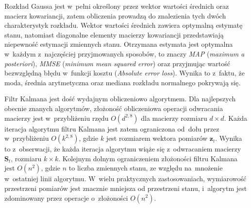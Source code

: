 \par
Rozkład Gaussa jest w~pełni określony przez wektor wartości średnich oraz macierz kowariancji, zatem obliczenia prowadzą do znalezienia tych dwóch charakterystyk rozkładu. Wektor wartości średnich zawiera optymalną estymatę stanu, natomiast diagonalne elementy macierzy kowariancji przedstawiają niepewność estymacji zmiennych stanu. Otrzymana estymata jest optymalna w~każdym z~najczęściej przyjmowanych sposobów, to znaczy \textit{MAP} (\textit{maximum a posteriori}), \textit{MMSE} (\textit{minimum mean squared error}) oraz przyjmując wartość bezwzględną błędu w~funkcji kosztu (\textit{Absolute error loss}). Wynika to z~faktu, że moda, średnia arytmetyczna oraz mediana rozkładu normalnego pokrywają się. \cite[21]{Sarka} %
\par
Filtr Kalmana jest dość wydajnym obliczeniowo algorytmem. Dla najlepszych obecnie znanych algorytmów, złożoność obliczeniowa operacji odwracania macierzy jest w~przybliżeniu rzędu $O(d^{2,8})$ dla macierzy rozmiaru $d \times d$. Każda iteracja algorytmu filtru Kalmana jest zatem ograniczona od~dołu przez w~przybliżeniu $O(k^{2,8})$, gdzie $k$ jest rozmiarem wektora pomiarów $\mathbf{z}_t$. Wynika to z~obserwacji, że każda iteracja algorytmu wiąże się z~odwracaniem macierzy $\mathbf{S}_t$, rozmiaru $k \times k$. Kolejnym dolnym ograniczeniem złożoności filtru Kalmana jest $O(n^2)$, gdzie $n$ to liczba zmiennych stanu, ze względu na~mnożenie w~ostatniej linii algorytmu. W~wielu praktycznych zastosowaniach, wymiarowość przestrzeni pomiarów jest znacznie mniejsza od przestrzeni stanu, i~algorytm jest zdominowany przez operacje o~złożoności $O(n^2)$. \cite[37]{Thrun} %
